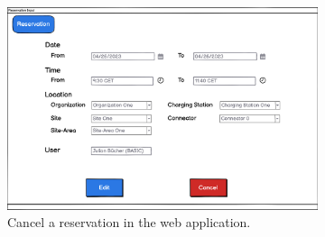 \begin{figure}[h]
    \centering
     \begin{subfigure}[c]{0.6\textwidth}
         \includegraphics[width=\textwidth]{resources/images/main/5_design/mockups/cancel_reservation/web/Cancel_Reservation.png}
         \captionsetup{skip=33pt}
         \caption{Cancel a reservation in the web application.}
         \label{fig:web-cancel-reservation-mockup}
    \end{subfigure}
     \hfill
     \begin{subfigure}[c]{0.3\textwidth}

\end{subfigure}
\end{figure}
